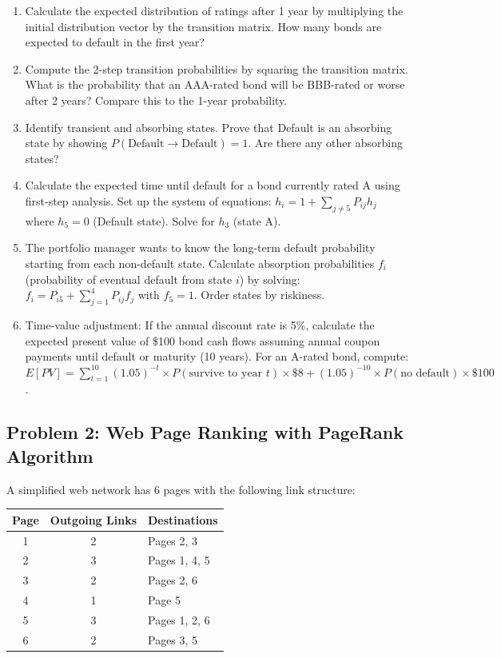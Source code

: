 \documentclass[12pt]{article}
\begin{document}
\begin{enumerate}[label=(\alph*)]
\item Calculate the expected distribution of ratings after 1 year by multiplying the initial distribution vector by the transition matrix. How many bonds are expected to default in the first year?

\item Compute the 2-step transition probabilities by squaring the transition matrix. What is the probability that an AAA-rated bond will be BBB-rated or worse after 2 years? Compare this to the 1-year probability.

\item Identify transient and absorbing states. Prove that Default is an absorbing state by showing $P(\text{Default} \to \text{Default}) = 1$. Are there any other absorbing states?

\item Calculate the expected time until default for a bond currently rated A using first-step analysis. Set up the system of equations: $h_i = 1 + \sum_{j \neq 5} P_{ij}h_j$ where $h_5 = 0$ (Default state). Solve for $h_3$ (state A).

\item The portfolio manager wants to know the long-term default probability starting from each non-default state. Calculate absorption probabilities $f_i$ (probability of eventual default from state $i$) by solving: $f_i = P_{i5} + \sum_{j=1}^{4} P_{ij}f_j$ with $f_5 = 1$. Order states by riskiness.

\item Time-value adjustment: If the annual discount rate is 5\%, calculate the expected present value of \$100 bond cash flows assuming annual coupon payments until default or maturity (10 years). For an A-rated bond, compute: $E[PV] = \sum_{t=1}^{10} (1.05)^{-t} \times P(\text{survive to year } t) \times \$8 + (1.05)^{-10} \times P(\text{no default}) \times \$100$.
\end{enumerate}

\subsection*{Problem 2: Web Page Ranking with PageRank Algorithm}

A simplified web network has 6 pages with the following link structure:

\begin{center}
\begin{tabular}{ccl}
\toprule
Page & Outgoing Links & Destinations \\
\midrule
1 & 2 & Pages 2, 3 \\
2 & 3 & Pages 1, 4, 5 \\
3 & 2 & Pages 2, 6 \\
4 & 1 & Page 5 \\
5 & 3 & Pages 1, 2, 6 \\
6 & 2 & Pages 3, 5 \\
\bottomrule
\end{tabular}
\end{center}
\end{document}
